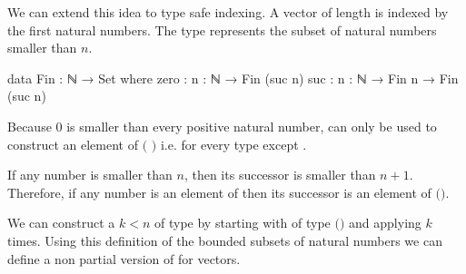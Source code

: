 We can extend this idea to type safe indexing.
A vector of length  is indexed by the first 
natural numbers.
The type \AgdaSpace{} represents the subset of
natural numbers smaller than $n$.

\begin{code}
data Fin : ℕ → Set where
  zero  : {n : ℕ} → Fin (suc n)
  suc   : {n : ℕ} → Fin n → Fin (suc n)
\end{code}
Because $0$ is smaller than every positive natural number,
 can only be used to construct an element of
\AgdaSpace{}$($
$)$ i.e. for every type except
\AgdaSpace{}.

If any number is smaller than $n$, then its successor is smaller than $n+1$.
Therefore, if any number is an element of
\AgdaSpace{}
then its successor is an element of
\AgdaSpace{}$($\AgdaSpace{}$)$.

We can construct a $k<n$ of type
\AgdaSpace{} by starting with
 of type
\AgdaSpace{}$($$)$ and applying
 $k$ times.
Using this definition of the bounded subsets of natural numbers we can define
a non partial version of \AgdaFunction{\_!\_} for vectors.

